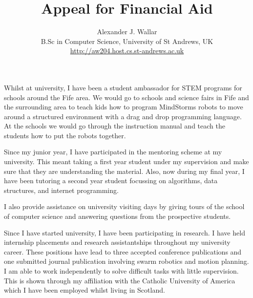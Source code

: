 \documentclass{article}
\begin{document}
\setlength{\parskip}{4pt} %

\title{Appeal for Financial Aid}

\author{Alexander J. Wallar \\ B.Sc in Computer Science, University of St Andrews, UK
\\ \url{http://aw204.host.cs.st-andrews.ac.uk}}

\maketitle

Whilst at university, I have been a student ambassador for STEM programs for schools around the Fife area. We would go to schools and science fairs in Fife and the surrounding area to teach kids how to program MindStorms robots to move around a structured environment with a drag and drop programming language. At the schools we would go through the instruction manual and teach the students how to put the robots together.

Since my junior year, I have participated in the mentoring scheme at my university. This meant taking a first year student under my supervision and make sure that they are understanding the material. Also, now during my final year, I have been tutoring a second year student focussing on algorithms, data structures, and internet programming.

I also provide assistance on university visiting days by giving tours of the school of computer science and answering questions from the prospective students.

Since I have started university, I have been participating in research. I have held internship placements and research assistantships throughout my university career. These positions have lead to three accepted conference publications and one submitted journal publication involving swarm robotics and motion planning. I am able to work independently to solve difficult tasks with little supervision. This is shown through my affiliation with the Catholic University of America which I have been employed whilst living in Scotland.

 
\end{document}
